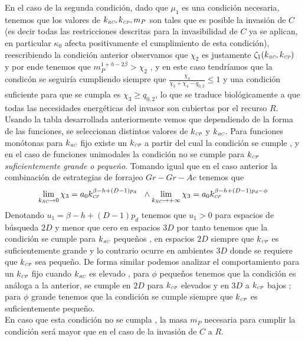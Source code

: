 En el caso de la segunda condici\'on, dado que $\mu_1$ es una condici\'on necesaria, tenemos que los valores de $k_{\textit{\tiny RC}} , k_{\textit{\tiny CP}} , m_P$ son tales que es posible la invasi\'on de $C$(es decir todas las restricciones descritas para la invasibilidad de $C$ ya se aplican, en particular $\kappa_0$ afecta positivamente el cumplimiento de esta condici\'on), reescribiendo la condici\'on anterior observamos que $\chi_2$ es justamente $\zeta_1(k_{\textit{\tiny RC}},k_{\textit{\tiny CP}})$ y por ende tenemos que $m_P^{1 + h - 2\beta} > \chi_2$ , y en este caso tendr\'iamos que la condic\'on se seguir\'ia cumpliendo siempre que $\frac{\chi_4}{\chi_3 + \chi_4 - q_{0,2}} \leq 1$ y una condici\'on suficiente para que se cumpla es $ \chi_3 \geq q_{0,2}$, lo que se traduce biol\'ogicamente a que todas las necesidades energ\'eticas del invasor son cubiertas por el recurso $R$.\\

Usando la tabla desarrollada anteriormente vemos que dependiendo de la forma de las funciones, se seleccionan distintos valores de $k_{\textit{\tiny CP}}$ y $k_{\textit{\tiny RC}}$. Para funciones mon\'otonas para $k_{\textit{\tiny RC}}$ fijo existe un $k_{\textit{\tiny CP}}$ a partir del cual la condici\'on se cumple , y en el caso de funciones unimodales la condici\'on no se cumple para $k_{\textit{\tiny CP}}$ \emph{suficientemente grande o peque\~no}. Tomando igual que en el caso anterior la combinaci\'on de estrategias de forrajeo $Gr-Gr-Ac$ tenemos que 
\begin{equation}
  \lim_{k_{\textit{\tiny RC}} \to 0} \chi_3 = a_0 k_{\textit{\tiny CP}}^{\beta - h + (D-1)p_d}  \ \ \land \lim_{k_{\textit{\tiny RC}} \to + \infty} \chi_3 = a_0 k_{\textit{\tiny CP}}^{\beta -h + (D-1)p_d - \phi} 
\end{equation}
Denotando $u_1 = \beta - h + (D-1)p_d$ tenemos que $ u_1 >0$ para espacios de b\'usqueda $2D$ y menor que cero en espacios $3D$ por tanto tenemos que la condici\'on se cumple para $k_{\textit{\tiny RC}}$ peque\~nos , en espacios $2D$ siempre que $k_{\textit{\tiny CP}}$ es suficientemente grande y lo contrario ocurre en ambientes $3D$ donde se requiere que $k_{\textit{\tiny CP}}$ sea peque\~no. De forma similar podemos analizar el comportamiento para un $k_{\textit{\tiny CP}}$ fijo cuando $k_{\textit{\tiny RC}}$ es elevado , para $\phi$ peque\~nos tenemos que la condici\'on es an\'aloga a la anterior, se cumple en $2D$ para $k_{\textit{\tiny CP}}$ elevados y en $3D$ a $k_{\textit{\tiny CP}}$ bajos ; para $\phi$ grande tenemos que la condici\'on se cumple siempre que $k_{\textit{\tiny CP}}$ es suficientemente peque\~no.\\
En caso que esta condici\'on no se cumpla , la masa $m_P$ necesaria para cumplir la condici\'on ser\'a mayor que en el caso de la invasi\'on de $C$ a $R$.\\

